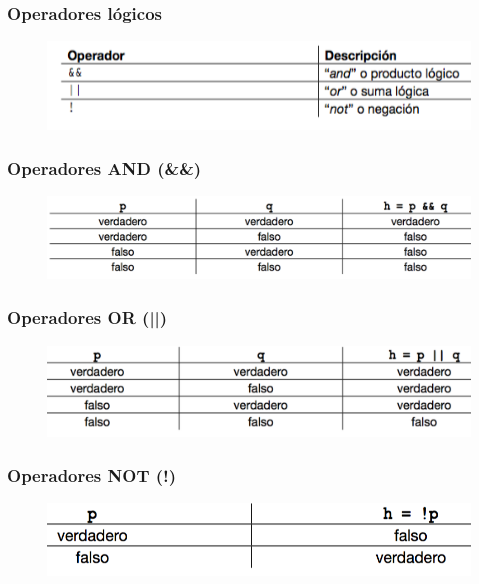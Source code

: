 \documentclass[handout]{beamer}
\begin{document}
\begin{frame}[t]\frametitle{Operadores lógicos}
    
\begin{figure}[tb]
  \centering
  \includegraphics[scale=.7]{./img/oplog}
\end{figure}

\end{frame}

\begin{frame}[t]\frametitle{Operadores AND (\&\&)}
    
\begin{figure}[tb]
  \centering
  \includegraphics[scale=.5]{./img/oplog1}
\end{figure}

\end{frame}

\begin{frame}[t]\frametitle{Operadores OR (||)}
    
\begin{figure}[tb]
  \centering
  \includegraphics[scale=.5]{./img/oplogOR}
\end{figure}

\end{frame}

\begin{frame}[t]\frametitle{Operadores NOT (!)}
    
\begin{figure}[tb]
  \centering
  \includegraphics[scale=.5]{./img/oplogNOT}
\end{figure}

\end{frame}
\end{document}
